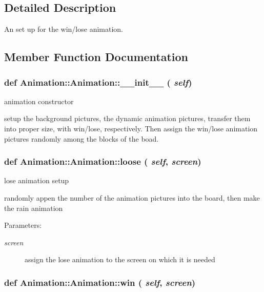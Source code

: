 \subsection{Detailed Description}
An set up for the win/lose animation. 



\subsection{Member Function Documentation}
\subsubsection{\setlength{\rightskip}{0pt plus 5cm}def Animation::Animation::\_\-\_\-init\_\-\_\- ( {\em self})}\label{classAnimation_1_1Animation_50be6f86ee2df0720b082f7a08674b94}


animation constructor 

setup the background pictures, the dynamic animation pictures, transfer them into proper size, with win/lose, respectively. Then assign the win/lose animation pictures randomly among the blocks of the boad. 
\subsubsection{\setlength{\rightskip}{0pt plus 5cm}def Animation::Animation::loose ( {\em self},  {\em screen})}\label{classAnimation_1_1Animation_c467c93c490f544f7dd68dd4f6172fe5}


lose animation setup 

randomly appen the number of the animation pictures into the board, then make the rain animation \begin{Desc}
\item[Parameters:]
\begin{description}
\item[{\em screen}]assign the lose animation to the screen on which it is needed \end{description}
\end{Desc}
\subsubsection{\setlength{\rightskip}{0pt plus 5cm}def Animation::Animation::win ( {\em self},  {\em screen})}\label{classAnimation_1_1Animation_a893034f438e53a7686a424ab27e94ce}


